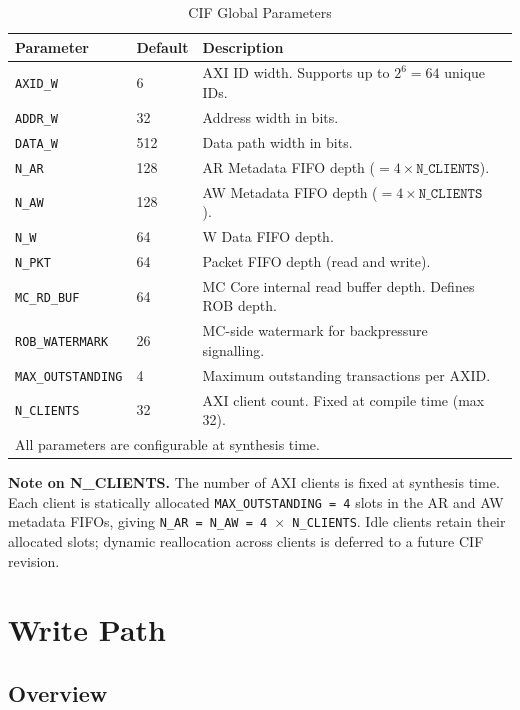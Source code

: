 \begin{table}[h]
\centering
\begin{tabular}{llll}
\toprule
\textbf{Parameter} & \textbf{Default} & \textbf{Description} \\
\midrule
\texttt{AXID\_W}         & 6     & AXI ID width. Supports up to $2^6 = 64$ unique IDs. \\
\texttt{ADDR\_W}         & 32    & Address width in bits. \\
\texttt{DATA\_W}         & 512   & Data path width in bits. \\
\texttt{N\_AR}           & 128   & AR Metadata FIFO depth ($= 4 \times \texttt{N\_CLIENTS}$). \\
\texttt{N\_AW}           & 128   & AW Metadata FIFO depth ($= 4 \times \texttt{N\_CLIENTS}$). \\
\texttt{N\_W}            & 64    & W Data FIFO depth. \\
\texttt{N\_PKT}          & 64    & Packet FIFO depth (read and write). \\
\texttt{MC\_RD\_BUF}     & 64    & MC Core internal read buffer depth. Defines ROB depth. \\
\texttt{ROB\_WATERMARK}  & 26    & MC-side watermark for backpressure signalling. \\
\texttt{MAX\_OUTSTANDING}& 4     & Maximum outstanding transactions per AXID. \\
\texttt{N\_CLIENTS}      & 32    & AXI client count. Fixed at compile time (max 32). \\
\midrule
\multicolumn{3}{l}{\small All parameters are configurable at synthesis time.} \\
\bottomrule
\end{tabular}
\caption{CIF Global Parameters}
\end{table}

\textbf{Note on N\_CLIENTS.} The number of AXI clients is fixed at synthesis time. Each client is statically allocated \texttt{MAX\_OUTSTANDING = 4} slots in the AR and AW metadata FIFOs, giving \texttt{N\_AR = N\_AW = 4 $\times$ N\_CLIENTS}. Idle clients retain their allocated slots; dynamic reallocation across clients is deferred to a future CIF revision.

\section{Write Path}

\subsection{Overview}

